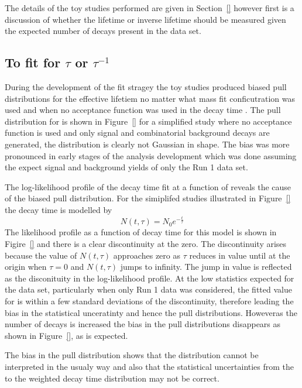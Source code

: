 { The details of the toy studies performed are given in Section~\ref{} however first is a discussion of whether the \bsmumu lifetime or inverse lifetime should be measured given the expected number of decays present in the data set.  

\subsection{To fit for $\tau$ or $\tau^{-1}$}
\label{sec:tauORinvtau}
During the development of the fit stragey the toy studies produced biased pull distributions for the \bsmumu effective lifetiem no matter what mass fit conficutration was used and when no acceptance function was used in the decay time \pdfs. The pull distribution for \tmumu is shown in Figure~\ref{} for a simplified study where no acceptance function is used and only signal and combinatorial background decays are generated, the distribution is clearly not Gaussian in shape. The bias was more pronounced in early stages of the analysis development which was done assuming the expect signal and background yields of only the Run 1 data set. 

The log-likelihood profile of the decay time fit at a function of \tmumu reveals the cause of the biased pull distribution. For the simiplifed studies illustrated in Figure~\ref{} the decay time is modelled by
\begin{equation}
N(t, \tau) = N_{0}e^{-\frac{t}{\tau}}
\end{equation}
The likelihood profile as a function of decay time for this model is shown in Figire~\ref{} and there is a clear discontinuity at the zero. The discontinuity arises because the value of $N(t, \tau)$ approaches zero as $\tau$ reduces in value until at the origin when $\tau = 0$ and $N(t, \tau)$ jumps to infinity. The jump in value is reflected as the disconituity in the log-likelihood profile. At the low statistics expected for the data set, particularly when only Run 1 data was considered, the fitted value for \tmumu is within a few standard deviations of the discontinuity, therefore leading the bias in the statistical unceratinty and hence the pull distributions. Howeveras the number of \bsmumu decays is increased the bias in the \tmumu pull distributions disappears as shown in Figure~\ref{}, as is expected.

The bias in the \tmumu pull distribution shows that the distribution cannot be interpreted in the usualy way and also that the statistical uncertainties from the \ml to the weighted decay time distribution may not be correct. 

}
